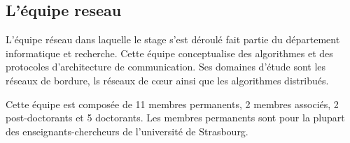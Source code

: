 \subsection{L'équipe reseau}

L'équipe réseau dans laquelle le stage s'est déroulé fait partie du département informatique et recherche. Cette équipe conceptualise des algorithmes et des protocoles d'architecture de communication. Ses domaines d'étude sont les réseaux de bordure, ls réseaux de cœur ainsi que les algorithmes distribués.

Cette équipe est composée de 11 membres permanents, 2 membres associés, 2 post-doctorants et 5 doctorants. Les membres permanents sont pour la plupart des enseignants-chercheurs de l'université de Strasbourg.
